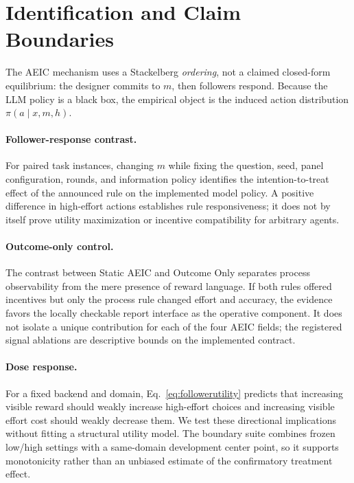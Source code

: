 \section{Identification and Claim Boundaries}
\label{sec:identification}

The AEIC mechanism uses a Stackelberg \emph{ordering}, not a claimed closed-form equilibrium: the designer commits to $m$, then followers respond. Because the LLM policy is a black box, the empirical object is the induced action distribution $\pi(a\mid x,m,h)$.

\paragraph{Follower-response contrast.}
For paired task instances, changing $m$ while fixing the question, seed, panel configuration, rounds, and information policy identifies the intention-to-treat effect of the announced rule on the implemented model policy. A positive difference in high-effort actions establishes rule responsiveness; it does not by itself prove utility maximization or incentive compatibility for arbitrary agents.

\paragraph{Outcome-only control.}
The contrast between Static AEIC and Outcome Only separates process observability from the mere presence of reward language. If both rules offered incentives but only the process rule changed effort and accuracy, the evidence favors the locally checkable report interface as the operative component. It does not isolate a unique contribution for each of the four AEIC fields; the registered signal ablations are descriptive bounds on the implemented contract.

\paragraph{Dose response.}
For a fixed backend and domain, Eq.~\eqref{eq:followerutility} predicts that increasing visible reward should weakly increase high-effort choices and increasing visible effort cost should weakly decrease them. We test these directional implications without fitting a structural utility model. The boundary suite combines frozen low/high settings with a same-domain development center point, so it supports monotonicity rather than an unbiased estimate of the confirmatory treatment effect.

